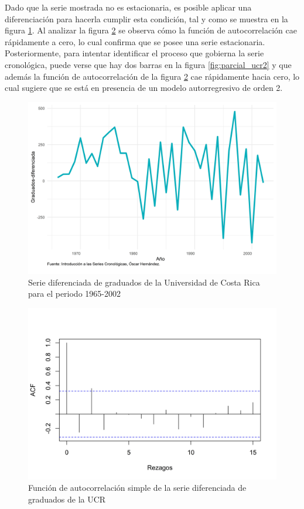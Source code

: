 \documentclass[
]{article}
\begin{document}
Dado que la serie mostrada no es estacionaria, es posible aplicar una
diferenciación para hacerla cumplir esta condición, tal y como se
muestra en la figura \ref{fig:ejemplo_ucr_diferenciada}. Al analizar la
figura \ref{fig:auto_ucr2} se observa cómo la función de autocorrelación
cae rápidamente a cero, lo cual confirma que se posee una serie
estacionaria. Posteriormente, para intentar identificar el proceso que
gobierna la serie cronológica, puede verse que hay dos barras en la
figura \ref{fig:parcial_ucr2} y que además la función de autocorrelación
de la figura \ref{fig:auto_ucr2} cae rápidamente hacia cero, lo cual
sugiere que se está en presencia de un modelo autorregresivo de orden 2.

\begin{figure}[!h]
\includegraphics[width=1\linewidth,height=1\textheight]{Tesis_files/figure-latex/ejemplo_ucr_diferenciada-1} \caption{Serie diferenciada de graduados de la Universidad de Costa Rica para el periodo 1965-2002}\label{fig:ejemplo_ucr_diferenciada}
\end{figure}

\begin{figure}[!h]
\includegraphics[width=1\linewidth,height=1\textheight]{Tesis_files/figure-latex/auto_ucr2-1} \caption{Función de autocorrelación simple de la serie diferenciada de graduados de la UCR}\label{fig:auto_ucr2}
\end{figure}
\end{document}

